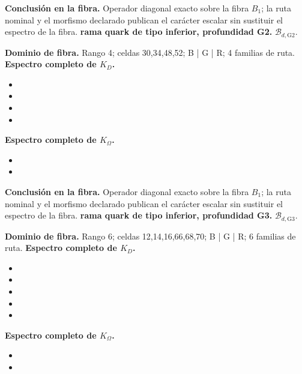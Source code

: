 \noindent\textbf{Conclusión en la fibra.} Operador diagonal exacto sobre la fibra \(B_1\); la ruta nominal y el morfismo declarado publican el carácter escalar sin sustituir el espectro de la fibra.
\medskip
{}
\noindent\textbf{rama quark de tipo inferior, profundidad G2.} \(\mathcal B_{d,\mathrm{G2}}\).\par
\noindent\textbf{Dominio de fibra.} Rango 4; celdas 30,34,48,52; B | G | R; 4 familias de ruta.
\noindent\textbf{Espectro completo de \(K_D\).}
\begin{itemize}
\item \texttt{}
\item \texttt{}
\item \texttt{}
\item \texttt{}
\end{itemize}
\noindent\textbf{Espectro completo de \(K_\Omega\).}
\begin{itemize}
\item \texttt{}
\item \texttt{}
\end{itemize}
\noindent\textbf{Conclusión en la fibra.} Operador diagonal exacto sobre la fibra \(B_1\); la ruta nominal y el morfismo declarado publican el carácter escalar sin sustituir el espectro de la fibra.
\medskip
{}
\noindent\textbf{rama quark de tipo inferior, profundidad G3.} \(\mathcal B_{d,\mathrm{G3}}\).\par
\noindent\textbf{Dominio de fibra.} Rango 6; celdas 12,14,16,66,68,70; B | G | R; 6 familias de ruta.
\noindent\textbf{Espectro completo de \(K_D\).}
\begin{itemize}
\item \texttt{}
\item \texttt{}
\item \texttt{}
\item \texttt{}
\item \texttt{}
\end{itemize}
\noindent\textbf{Espectro completo de \(K_\Omega\).}
\begin{itemize}
\item \texttt{}
\item \texttt{}
\end{itemize}
